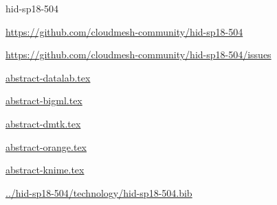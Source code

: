 \begin{IU}

hid-sp18-504

\url{https://github.com/cloudmesh-community/hid-sp18-504}

\url{https://github.com/cloudmesh-community/hid-sp18-504/issues}

\href{https://github.com/cloudmesh-community/hid-sp18-504/blob/master//technology/abstract-datalab.tex}{abstract-datalab.tex}

\href{https://github.com/cloudmesh-community/hid-sp18-504/blob/master//technology/abstract-bigml.tex}{abstract-bigml.tex}

\href{https://github.com/cloudmesh-community/hid-sp18-504/blob/master//technology/abstract-dmtk.tex}{abstract-dmtk.tex}

\href{https://github.com/cloudmesh-community/hid-sp18-504/blob/master//technology/abstract-orange.tex}{abstract-orange.tex}

\href{https://github.com/cloudmesh-community/hid-sp18-504/blob/master//technology/abstract-knime.tex}{abstract-knime.tex}

\href{https://github.com/cloudmesh-community/hid-sp18-504/blob/master//technology/hid-sp18-504.bib}{../hid-sp18-504/technology/hid-sp18-504.bib}

\end{IU}


